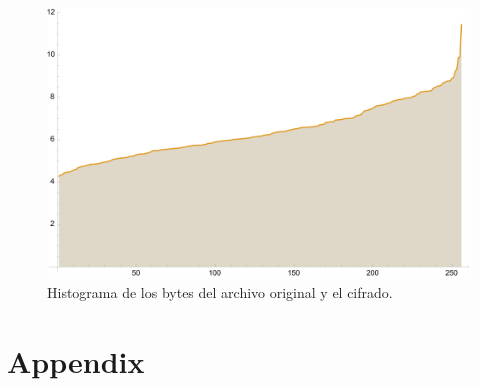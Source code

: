 \begin{figure}[H]
    \centering
    \includegraphics[scale=0.7]{../img/historygram}
    \caption*{Histograma de los bytes del archivo
original y el cifrado.}\label{fig:d2}
\end{figure}

\newpage
\section{Appendix}

